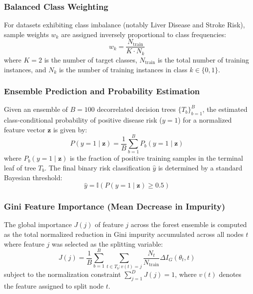 \subsubsection{Balanced Class Weighting}
For datasets exhibiting class imbalance (notably Liver Disease and Stroke Risk), sample weights $w_k$ are assigned inversely proportional to class frequencies:
\begin{equation}
    w_k = \frac{N_{\text{train}}}{K \cdot N_k}
    \label{eq:class_weight}
\end{equation}
where $K = 2$ is the number of target classes, $N_{\text{train}}$ is the total number of training instances, and $N_k$ is the number of training instances in class $k \in \{0, 1\}$.

\subsubsection{Ensemble Prediction and Probability Estimation}
Given an ensemble of $B = 100$ decorrelated decision trees $\{T_b\}_{b=1}^B$, the estimated class-conditional probability of positive disease risk ($y = 1$) for a normalized feature vector $\mathbf{z}$ is given by:
\begin{equation}
    P(y = 1 \mid \mathbf{z}) = \frac{1}{B} \sum_{b=1}^{B} P_b(y = 1 \mid \mathbf{z})
    \label{eq:ensemble_prob}
\end{equation}
where $P_b(y = 1 \mid \mathbf{z})$ is the fraction of positive training samples in the terminal leaf of tree $T_b$. The final binary risk classification $\hat{y}$ is determined by a standard Bayesian threshold:
\begin{equation}
    \hat{y} = \mathbb{I}\left(P(y = 1 \mid \mathbf{z}) \ge 0.5\right)
    \label{eq:decision_rule}
\end{equation}

\subsubsection{Gini Feature Importance (Mean Decrease in Impurity)}
The global importance $J(j)$ of feature $j$ across the forest ensemble is computed as the total normalized reduction in Gini impurity accumulated across all nodes $t$ where feature $j$ was selected as the splitting variable:
\begin{equation}
    J(j) = \frac{1}{B} \sum_{b=1}^{B} \sum_{t \in T_b: v(t) = j} \frac{N_t}{N_{\text{train}}} \Delta I_G(\theta_t, t)
    \label{eq:feature_importance}
\end{equation}
subject to the normalization constraint $\sum_{j=1}^{D} J(j) = 1$, where $v(t)$ denotes the feature assigned to split node $t$.

